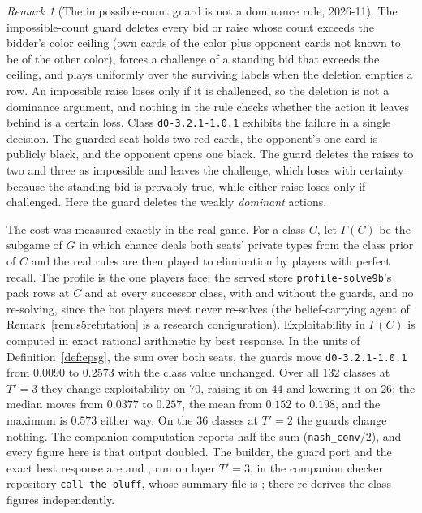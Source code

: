 \documentclass[11pt]{article}
\theoremstyle{plain}
\theoremstyle{definition}
\theoremstyle{remark}
\newtheorem{remark}[theorem]{Remark}
\newcommand{\code}[1]{\texttt{\small #1}}
\newcommand{\game}{\ensuremath{G}}
\begin{document}
\begin{remark}[The impossible-count guard is not a dominance rule, 2026-11]
\label{rem:guardcounter}
The impossible-count guard deletes every bid or raise whose count
exceeds the bidder's color ceiling (own cards of the color plus
opponent cards not known to be of the other color), forces a challenge
of a standing bid that exceeds the ceiling, and plays uniformly over the
surviving labels when the deletion empties a row. An impossible raise
loses only if it is challenged, so the deletion is not a dominance
argument, and nothing in the rule checks whether the action it leaves
behind is a certain loss. Class \code{d0-3.2.1-1.0.1} exhibits the
failure in a single decision. The guarded seat holds two red cards,
the opponent's one card is publicly black, and the opponent opens one
black. The guard deletes the raises to two and three as impossible and
leaves the challenge, which loses with certainty because the standing
bid is provably true, while either raise loses only if challenged. Here
the guard deletes the weakly \emph{dominant} actions.

The cost was measured exactly in the real game. For a class $C$, let
$\Gamma(C)$ be the subgame of $\game$ in which chance deals both seats'
private types from the class prior of $C$ and the real rules are then
played to elimination by players with perfect recall. The profile is
the one players face: the served store \code{profile-solve9b}'s pack
rows at $C$ and at every successor class, with and without the
guards, and no re-solving, since the bot players meet never re-solves
(the belief-carrying agent of Remark~\ref{rem:s5refutation} is a
research configuration). Exploitability in $\Gamma(C)$ is computed in
exact rational arithmetic by best response. In the units of
Definition~\ref{def:epsg}, the sum over both seats, the guards move
\code{d0-3.2.1-1.0.1} from $0.0090$ to $0.2573$ with the class value
unchanged. Over all $132$ classes at $T'=3$ they change exploitability
on $70$, raising it on $44$ and lowering it on $26$; the median moves
from $0.0377$ to $0.257$, the mean from $0.152$ to $0.198$, and the
maximum is $0.573$ either way. On the $36$ classes at $T'=2$ the guards
change nothing. The companion computation reports half the sum
(\texttt{nash\_conv}$/2$), and every figure here is that output
doubled. The builder, the guard port and the exact best response are
 and , run on layer
$T'=3$, in the companion checker repository \code{call-the-bluff},
whose summary file is ; 
there re-derives the class figures independently.


\end{remark}
\end{document}

